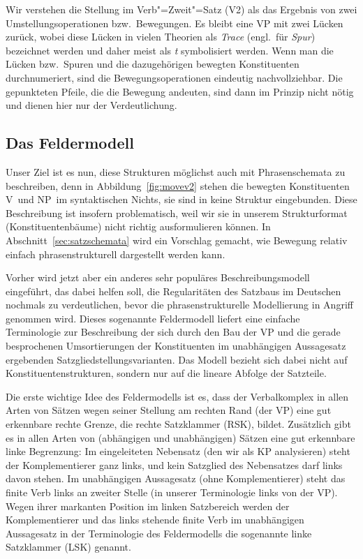 
Wir verstehen die Stellung im Verb"=Zweit"=Satz (V2) als das Ergebnis von zwei Umstellungsoperationen bzw.\ Bewegungen.
Es bleibt eine VP mit zwei Lücken zurück, wobei diese Lücken in vielen Theorien als \textit{Trace} (engl.\ für \textit{Spur}) bezeichnet werden und daher meist als \textit{t} symbolisiert werden.
Wenn man die Lücken bzw.\ Spuren und die dazugehörigen bewegten Konstituenten durchnumeriert, sind die Bewegungsoperationen eindeutig nachvollziehbar.
Die gepunkteten Pfeile, die die Bewegung andeuten, sind dann im Prinzip nicht nötig und dienen hier nur der Verdeutlichung.

\subsection{Das Feldermodell}

Unser Ziel ist es nun, diese Strukturen möglichst auch mit Phrasenschemata zu beschreiben, denn in Abbildung~\ref{fig:movev2} stehen die bewegten Konstituenten V\ORi\ und NP\ORii\ im syntaktischen Nichts, sie sind in keine Struktur eingebunden.
Diese Beschreibung ist insofern problematisch, weil wir sie in unserem Strukturformat (Konstituentenbäume) nicht richtig ausformulieren können.
In Abschnitt~\ref{sec:satzschemata} wird ein Vorschlag gemacht, wie Bewegung relativ einfach phrasenstrukturell dargestellt werden kann.

Vorher wird jetzt aber ein anderes sehr populäres Beschreibungsmodell eingeführt, das dabei helfen soll, die Regularitäten des Satzbaus im Deutschen nochmals zu verdeutlichen, bevor die phrasenstrukturelle Modellierung in Angriff genommen wird.
Dieses sogenannte Feldermodell liefert eine einfache Terminologie zur Beschreibung der sich durch den Bau der VP und die gerade besprochenen Umsortierungen der Konstituenten im unabhängigen Aussagesatz ergebenden Satzgliedstellungsvarianten.
Das Modell bezieht sich dabei nicht auf Konstituentenstrukturen, sondern nur auf die lineare Abfolge der Satzteile.



Die erste wichtige Idee des Feldermodells ist es, dass der Verbalkomplex in allen Arten von Sätzen wegen seiner Stellung am rechten Rand (der VP) eine gut erkennbare rechte Grenze, die rechte Satzklammer (RSK), bildet.
Zusätzlich gibt es in allen Arten von (abhängigen und unabhängigen) Sätzen eine gut erkennbare linke Begrenzung:
Im eingeleiteten Nebensatz (den wir als KP analysieren) steht der Komplementierer ganz links, und kein Satzglied des Nebensatzes darf links davon stehen.
Im unabhängigen Aussagesatz (ohne Komplementierer) steht das finite Verb links an zweiter Stelle (in unserer Terminologie links von der VP).
Wegen ihrer markanten Position im linken Satzbereich werden der Komplementierer und das links stehende finite Verb im unabhängigen Aussagesatz in der Terminologie des Feldermodells die sogenannte linke Satzklammer (LSK) genannt.

